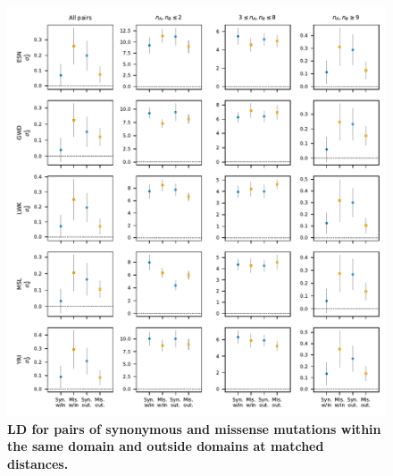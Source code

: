 \documentclass[]{article}
\begin{document}
\begin{figure}[ht!]
    \centering
    \includegraphics{../figures/data_domains_afr}
    \caption{
        \textbf{LD for pairs of synonymous and missense mutations within the
        same domain and outside domains at matched distances.}
    }
    \label{fig:domainsAFR}
\end{figure}
\end{document}
